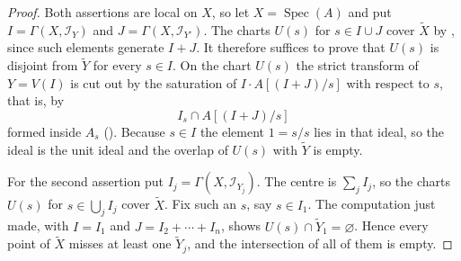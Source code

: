 \begin{proof}
  Both assertions are local on $X$, so let $X=\operatorname{Spec}(A)$ and put
  $I=\Gamma(X,\mathcal I_Y)$ and $J=\Gamma(X,\mathcal I_{Y'})$.  The charts
  $U(s)$ for $s\in I\cup J$ cover $\widetilde X$ by
  , since such elements generate
  $I+J$.  It therefore suffices to prove that $U(s)$ is disjoint from
  $\widetilde Y$ for every $s\in I$.  On the chart $U(s)$ the strict transform
  of $Y=V(I)$ is cut out by the saturation of $I\cdot A[(I+J)/s]$ with respect
  to $s$, that is, by
  \[
    I_s\cap A[(I+J)/s]
  \]
  formed inside $A_s$
  ().  Because $s\in I$ the
  element $1=s/s$ lies in that ideal, so the ideal is the unit ideal and the
  overlap of $U(s)$ with $\widetilde Y$ is empty.

  For the second assertion put $I_j=\Gamma(X,\mathcal I_{Y_j})$.  The centre
  is $\sum_jI_j$, so the charts $U(s)$ for $s\in\bigcup_jI_j$ cover
  $\widetilde X$.  Fix such an $s$, say $s\in I_1$.  The computation just made,
  with $I=I_1$ and $J=I_2+\cdots+I_n$, shows $U(s)\cap\widetilde Y_1
  =\varnothing$.  Hence every point of $\widetilde X$ misses at least one
  $\widetilde Y_j$, and the intersection of all of them is empty.
\end{proof}

